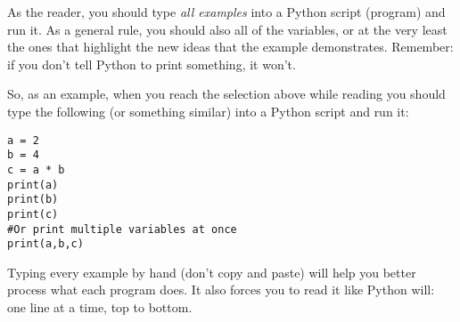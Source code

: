As the reader, you should type {\em all examples} into a Python script (program) and run it.  As a general rule, you should also  all of the variables, or at the very least the ones that highlight the new ideas that the example demonstrates.  Remember: if you don't tell Python to print something, it won't.

So, as an example, when you reach the selection above while reading you should type the following (or something similar) into a Python script and run it:

\begin{Verbatim}
a = 2
b = 4
c = a * b
print(a)
print(b)
print(c)
#Or print multiple variables at once
print(a,b,c)

\end{Verbatim}

Typing every example by hand (don't copy and paste) will help you better process what each program does.  It also forces you to read it like Python will: one line at a time, top to bottom.

